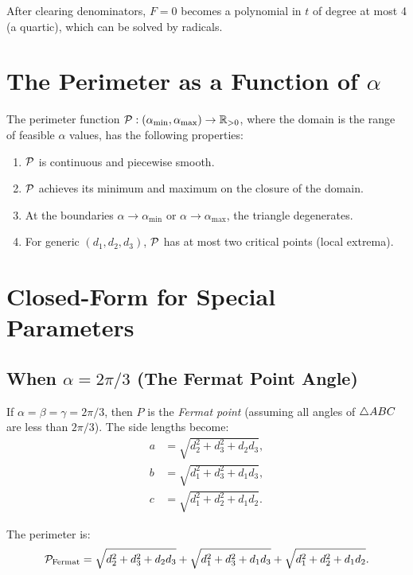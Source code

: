 After clearing denominators, $F = 0$ becomes a polynomial in $t$ of degree at most 4 (a quartic), which can be solved by radicals.

\section{The Perimeter as a Function of $\alpha$}

\begin{theorem}
The perimeter function $\mathcal{P}: (\alpha_{\min}, \alpha_{\max}) \to \mathbb{R}_{>0}$, where the domain is the range of feasible $\alpha$ values, has the following properties:
\begin{enumerate}[label=(\roman*)]
    \item $\mathcal{P}$ is continuous and piecewise smooth.
    \item $\mathcal{P}$ achieves its minimum and maximum on the closure of the domain.
    \item At the boundaries $\alpha \to \alpha_{\min}$ or $\alpha \to \alpha_{\max}$, the triangle degenerates.
    \item For generic $(d_1, d_2, d_3)$, $\mathcal{P}$ has at most two critical points (local extrema).
\end{enumerate}
\end{theorem}

\section{Closed-Form for Special Parameters}

\subsection{When $\alpha = 2\pi/3$ (The Fermat Point Angle)}
If $\alpha = \beta = \gamma = 2\pi/3$, then $P$ is the \emph{Fermat point} (assuming all angles of $\triangle ABC$ are less than $2\pi/3$). The side lengths become:
\begin{align}
a &= \sqrt{d_2^2 + d_3^2 + d_2 d_3}, \\
b &= \sqrt{d_1^2 + d_3^2 + d_1 d_3}, \\
c &= \sqrt{d_1^2 + d_2^2 + d_1 d_2}.
\end{align}

The perimeter is:
\begin{equation}
\mathcal{P}_{\text{Fermat}} = \sqrt{d_2^2 + d_3^2 + d_2 d_3} + \sqrt{d_1^2 + d_3^2 + d_1 d_3} + \sqrt{d_1^2 + d_2^2 + d_1 d_2}.
\end{equation}

